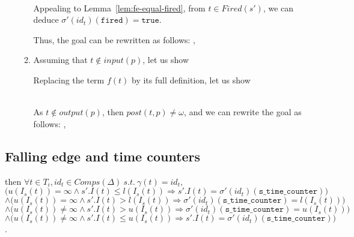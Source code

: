 \documentclass[dvipsnames,12pt]{article}
\begin{document}
\begin{niproof}
\begin{itemize}
\begin{enumerate}
          \\

          Appealing to Lemma~\ref{lem:fe-equal-fired}, from
          $t\in{}Fired(s')$, we can deduce
          $\sigma'(id_t)(\texttt{fired})=\mathtt{true}$.

          Thus, the goal can be rewritten as follows:
          \fbox{$\omega=\omega$}, 
          
        \item Assuming that $t\notin{}input(p)$, let us show

          Replacing the term $f(t)$ by its full definition, let us show

          \\

          As $t\notin{}output(p)$, then $post(t,p)\neq\omega$, and we
          can rewrite the goal as follows: ,
          
        \end{enumerate}
      \end{itemize}
\end{niproof}


\subsection{Falling edge and time counters}
\label{sec:fe-equal-tc}

\begin{lemma}
  \label{lem:fe-equal-tc}
  \fehyps{} then $\forall{}t\in{}T_i,id_t\in{}Comps(\Delta)~s.t.~\gamma(t)=id_t,$\\
  $\big(u(I_s(t))=\infty\land{}s'.I(t)\le{}l(I_s(t))\Rightarrow{}s'.I(t)=\sigma'(id_t)(\texttt{s\_time\_counter})\big)$\\
  $\land\big(u(I_s(t))=\infty\land{}s'.I(t)>{}l(I_s(t))\Rightarrow{}\sigma'(id_t)(\texttt{s\_time\_counter})=l(I_s(t))\big)$\\
  $\land\big(u(I_s(t))\neq\infty\land{}s'.I(t)>{}u(I_s(t))\Rightarrow{}\sigma'(id_t)(\texttt{s\_time\_counter})=u(I_s(t))\big)$\\
  $\land\big(u(I_s(t))\neq\infty\land{}s'.I(t)\le{}u(I_s(t))\Rightarrow{}s'.I(t)=\sigma'(id_t)(\texttt{s\_time\_counter})\big)$.
\end{lemma}
\end{document}
